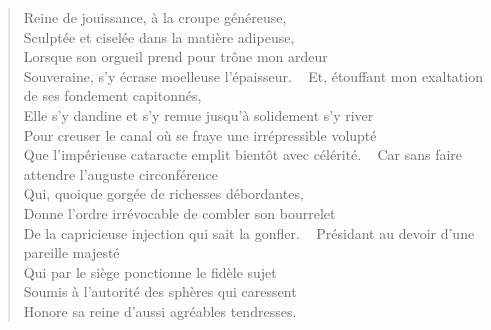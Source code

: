 \begin{verse}
Reine de jouissance, à la croupe généreuse,\\
Sculptée et ciselée dans la matière adipeuse,\\
Lorsque son orgueil prend pour trône mon ardeur\\
Souveraine, s’y écrase moelleuse l’épaisseur.
~
Et, étouffant mon exaltation de ses fondement capitonnés,\\
Elle s’y dandine et s’y remue jusqu’à solidement s’y river\\
Pour creuser le canal où se fraye une irrépressible volupté\\
Que l’impérieuse cataracte emplit bientôt avec célérité.
~
Car sans faire attendre l’auguste circonférence\\
Qui, quoique gorgée de richesses débordantes,\\
Donne l’ordre irrévocable de combler son bourrelet\\
De la capricieuse injection qui sait la gonfler.
~
Présidant au devoir d’une pareille majesté\\
Qui par le siège ponctionne le fidèle sujet\\
Soumis à l’autorité des sphères qui caressent\\
Honore sa reine d’aussi agréables tendresses.
\end{verse}

